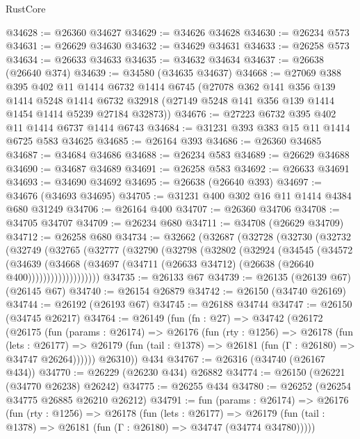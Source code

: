 \begin{lexlean}{RustCore}
\begin{coremodule}
@34628 := @26360 @34627
@34629 := @34626 @34628
@34630 := @26234 @573
@34631 := @26629 @34630
@34632 := @34629 @34631
@34633 := @26258 @573
@34634 := @26633 @34633
@34635 := @34632 @34634
@34637 := @26638 (@26640 @374)
@34639 := @34580 (@34635 @34637)
@34668 := @27069
    @388
    @395
    @402
    @11
    @1414
    @6732
    @1414
    @6745
    (@27078
      @362
      @141
      @356
      @139
      @1414
      @5248
      @1414
      @6732
      @32918
      (@27149 @5248 @141 @356 @139 @1414 @1454 @1414 @5239 @27184 @32873))
@34676 := @27223 @6732 @395 @402 @11 @1414 @6737 @1414 @6743
@34684 := @31231 @393 @383 @15 @11 @1414 @6725 @583 @34625
@34685 := @26164 @393
@34686 := @26360 @34685
@34687 := @34684 @34686
@34688 := @26234 @583
@34689 := @26629 @34688
@34690 := @34687 @34689
@34691 := @26258 @583
@34692 := @26633 @34691
@34693 := @34690 @34692
@34695 := @26638 (@26640 @393)
@34697 := @34676 (@34693 @34695)
@34705 := @31231 @400 @302 @16 @11 @1414 @4384 @680 @31249
@34706 := @26164 @400
@34707 := @26360 @34706
@34708 := @34705 @34707
@34709 := @26234 @680
@34711 := @34708 (@26629 @34709)
@34712 := @26258 @680
@34734 := @32662
    (@32687
      (@32728
        (@32730
          (@32732
            (@32749
              (@32765
                (@32777
                  (@32790
                    (@32798
                      (@32802
                        (@32924
                          (@34545
                            (@34572
                              (@34639
                                (@34668
                                  (@34697
                                    (@34711 (@26633 @34712) (@26638 (@26640 @400)))))))))))))))))))
@34735 := @26133 @67
@34739 := @26135 (@26139 @67) (@26145 @67)
@34740 := @26154 @26879
@34742 := @26150 (@34740 @26169)
@34744 := @26192 (@26193 @67)
@34745 := @26188 @34744
@34747 := @26150 (@34745 @26217)
@34764 := @26149
    (fun (fn : @27) =>
    @34742
      (@26172
        (@26175
          (fun (params : @26174) =>
          @26176
            (fun (rty : @1256) =>
            @26178
              (fun (lets : @26177) =>
              @26179 (fun (tail : @1378) => @26181 (fun (Γ : @26180) => @34747 @26264))))))
        @26310))
    @434
@34767 := @26316 (@34740 (@26167 @434))
@34770 := @26229 (@26230 @434) @26882
@34774 := @26150 (@26221 (@34770 @26238) @26242)
@34775 := @26255 @434
@34780 := @26252 (@26254 @34775 @26885 @26210 @26212)
@34791 := fun (params : @26174) =>
  @26176
    (fun (rty : @1256) =>
    @26178
      (fun (lets : @26177) =>
      @26179 (fun (tail : @1378) => @26181 (fun (Γ : @26180) => @34747 (@34774 @34780)))))

\end{coremodule}
\end{lexlean}
